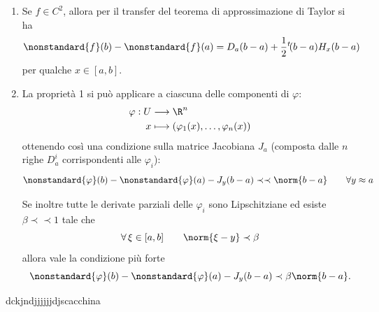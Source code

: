 {\begin{enumerate}
        Se inoltre le derivate parziali sono Lipschitziane ed esiste $ \beta \prec\prec 1 $\footnote{cioè $ \beta $ infinitesimo} tale che \[
            \forall\, \xi \in [a,b]\qquad \norm{\xi-y}\prec \beta
        \]allora vale la condizione più forte \[
            \nonstandard{f}(b)-\nonstandard{f}(a) - D_{y}(b-a) \prec \beta\norm{b-a}.
        \]
        \item Se $ f \in C^{2} $, allora per il transfer del teorema di approssimazione di Taylor si ha \[
            \nonstandard{f}(b)-\nonstandard{f}(a) = D_{a} (b-a) + \frac{1}{2} \null^{t}\!(b-a) H_{x} (b-a) 
        \]per qualche $ x \in [a,b] $.
        \item La proprietà 1 si può applicare a ciascuna delle componenti di $ \varphi $: \begin{align*}
            \varphi: U & \longrightarrow \R^{n}\\
            x &\longmapsto \left(\varphi_{1}(x), \dots, \varphi_{n}(x)  \right)
        \end{align*}ottenendo così una condizione sulla matrice Jacobiana $ J_{a}  $ (composta dalle $ n $ righe $ D_{a}^{i}  $ corrispondenti alle $ \varphi_{i}  $): \[
            \nonstandard{\varphi}(b)-\nonstandard{\varphi}(a)-J_{y}(b-a)\prec\prec \norm{b-a}\qquad\forall y \approx a 
        \]

        Se inoltre tutte le derivate parziali delle $ \varphi_{i}  $ sono Lipschitziane ed esiste $ \beta \prec\prec 1 $ tale che \[
            \forall\, \xi \in [a,b]\qquad \norm{\xi-y}\prec \beta
        \]allora vale la condizione più forte \[
            \nonstandard{\varphi}(b)-\nonstandard{\varphi}(a) - J_{y}(b-a) \prec \beta\norm{b-a}.
        \]
    \end{enumerate}
}{dckjndjjjjjjdjscacchina}{}


